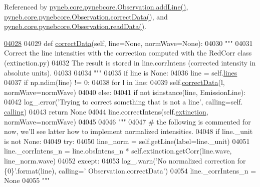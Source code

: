 Referenced by \hyperlink{pynebcore_8py_source_l03558}{pyneb.\-core.\-pynebcore.\-Observation.\-add\-Line()}, \hyperlink{pynebcore_8py_source_l04028}{pyneb.\-core.\-pynebcore.\-Observation.\-correct\-Data()}, and \hyperlink{pynebcore_8py_source_l03711}{pyneb.\-core.\-pynebcore.\-Observation.\-read\-Data()}.


\begin{DoxyCode}
\hypertarget{classpyneb_1_1core_1_1pynebcore_1_1_observation_l04028}{}\hyperlink{classpyneb_1_1core_1_1pynebcore_1_1_observation_a823a1fa51f042f2734cbc323c6a7d4bb}{04028} 
04029     \textcolor{keyword}{def }\hyperlink{classpyneb_1_1core_1_1pynebcore_1_1_observation_a823a1fa51f042f2734cbc323c6a7d4bb}{correctData}(self, line=None, normWave=None):
04030         \textcolor{stringliteral}{"""}
04031 \textcolor{stringliteral}{        Correct the line intensities with the correction computed with the RedCorr class (extinction.py)}
04032 \textcolor{stringliteral}{        The result is stored in line.corrIntens (corrected intensity in absolute units).}
04033 \textcolor{stringliteral}{}
04034 \textcolor{stringliteral}{        """}
04035         \textcolor{keywordflow}{if} line \textcolor{keywordflow}{is} \textcolor{keywordtype}{None}:
04036             line = self.\hyperlink{classpyneb_1_1core_1_1pynebcore_1_1_observation_a78332043ca9f290590edf6b8a1e5b767}{lines}
04037         \textcolor{keywordflow}{if} np.ndim(line) != 0:
04038             \textcolor{keywordflow}{for} l \textcolor{keywordflow}{in} line:
04039                 self.\hyperlink{classpyneb_1_1core_1_1pynebcore_1_1_observation_a823a1fa51f042f2734cbc323c6a7d4bb}{correctData}(l, normWave=normWave)
04040         \textcolor{keywordflow}{else}:
04041             \textcolor{keywordflow}{if} \textcolor{keywordflow}{not} isinstance(line, EmissionLine):
04042                 log\_.error(\textcolor{stringliteral}{'Trying to correct something that is not a line'}, calling=self.
      \hyperlink{classpyneb_1_1core_1_1pynebcore_1_1_observation_a2639fad9af4fefad20e4097295bd40e7}{calling})
04043                 \textcolor{keywordflow}{return} \textcolor{keywordtype}{None}  
04044             line.correctIntens(self.\hyperlink{classpyneb_1_1core_1_1pynebcore_1_1_observation_acdd6227c32bd92ec4a15b83110bcb570}{extinction}, normWave=normWave)
04045 
04046             \textcolor{stringliteral}{"""            }
04047 \textcolor{stringliteral}{            # the following is commented for now, we'll see latter how to implement normalized intensities.}
04048 \textcolor{stringliteral}{            if line.\_unit is not None:}
04049 \textcolor{stringliteral}{                try:}
04050 \textcolor{stringliteral}{                    line\_norm = self.getLine(label=line.\_unit)}
04051 \textcolor{stringliteral}{                    line.\_corrIntens\_n = line.obsIntens\_n * self.extinction.getCorr(line.wave,
       line\_norm.wave)}
04052 \textcolor{stringliteral}{                except:}
04053 \textcolor{stringliteral}{                    log\_.warn('No normalized correction for \{0\}'.format(line), calling='
      Observation.correctData')}
04054 \textcolor{stringliteral}{                    line.\_corrIntens\_n = None}
04055 \textcolor{stringliteral}{            """}
            
\end{DoxyCode}
